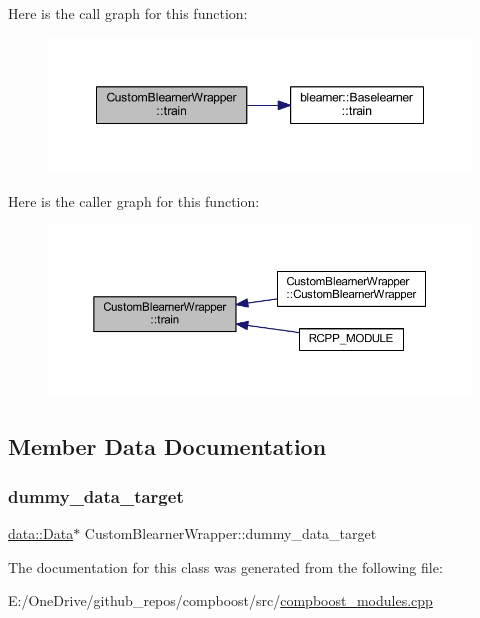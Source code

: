 Here is the call graph for this function\+:\nopagebreak
\begin{figure}[H]
\begin{center}
\leavevmode
\includegraphics[width=348pt]{class_custom_blearner_wrapper_a970f89e16f5dc5cfce1e1dc4461d34a5_cgraph}
\end{center}
\end{figure}
Here is the caller graph for this function\+:\nopagebreak
\begin{figure}[H]
\begin{center}
\leavevmode
\includegraphics[width=350pt]{class_custom_blearner_wrapper_a970f89e16f5dc5cfce1e1dc4461d34a5_icgraph}
\end{center}
\end{figure}


\subsection{Member Data Documentation}
\mbox{\label{class_custom_blearner_wrapper_af70b599670b5c64406e10b7bda9c0bb1}} 
\subsubsection{\texorpdfstring{dummy\+\_\+data\+\_\+target}{dummy\_data\_target}}
{\footnotesize\ttfamily \mbox{\hyperlink{classdata_1_1_data}{data\+::\+Data}}$\ast$ Custom\+Blearner\+Wrapper\+::dummy\+\_\+data\+\_\+target\hspace{0.3cm}{\ttfamily [private]}}



The documentation for this class was generated from the following file\+:\begin{DoxyCompactItemize}
\item 
E\+:/\+One\+Drive/github\+\_\+repos/compboost/src/\mbox{\hyperlink{compboost__modules_8cpp}{compboost\+\_\+modules.\+cpp}}\end{DoxyCompactItemize}
